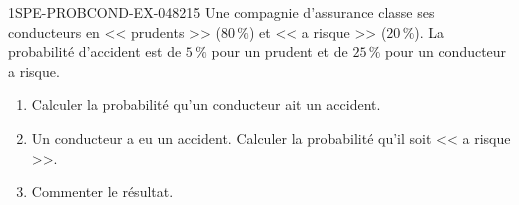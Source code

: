 \begin{exercice}{1SPE-PROBCOND-EX-048}{2}{15}
Une compagnie d'assurance classe ses conducteurs en << prudents >> ($80\,\%$) et << a risque >> ($20\,\%$). La probabilité d'accident est de $5\,\%$ pour un prudent et de $25\,\%$ pour un conducteur a risque.

\begin{enumerate}
  \item Calculer la probabilité qu'un conducteur ait un accident.
  \item Un conducteur a eu un accident. Calculer la probabilité qu'il soit << a risque >>.
  \item Commenter le résultat.
\end{enumerate}
\end{exercice}
